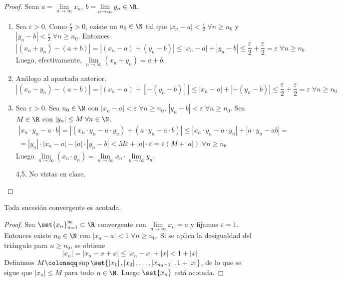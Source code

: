 \begin{proof}
	Sean \(a = \lim\limits_{n \to \infty} x_n \), \(b = \lim\limits_{n \to \infty} y_n \in \R\).
	\begin{enumerate}
		\item Sea \(\varepsilon > 0 \). Como \(\frac{\epsilon}{2} > 0\),   existe un \(n_0 \in \N 	\) tal que \(|x_n - a| < \frac{\varepsilon}{2} \; \forall n \geq n_0\) y  \(|y_n - b| < \frac{\varepsilon}{2} \; \forall n \geq n_0 \). Entonces
		      \[
			      |(x_n + y_n) - (a + b) | = |(x_n - a) + (y_n - b)| \leq |x_n - a| + |y_n - b| \leq \frac{\varepsilon}{2} + \frac{\varepsilon}{2} = \varepsilon \; \forall n \geq n_0
		      \]
		      Luego, efectivamente, \(\lim\limits_{n \to \infty} (x_n + y_n) = a + b \).
		\item Análogo al apartado anterior.
		      \[
			      |(x_n - y_n) - (a - b) | = |(x_n - a) +  [-(y_n - b)]| \leq |x_n - a| + |-(y_n - b)| \leq \frac{\varepsilon}{2} + \frac{\varepsilon}{2} = \varepsilon \; \forall n \geq n_0
		      \]
		\item Sea \(\varepsilon > 0 \). Sea \(n_0 \in \N \) con \(|x_n - a| < \varepsilon \; \forall n \geq n_0 \), \(|y_n - b| < \varepsilon \; \forall n \geq n_0 \). Sea \(M \in \R \) con \(|y_n| \leq M \; \forall n \in \N\).
		      \begin{multline*}
			      |x_n \cdot y_n - a \cdot b| = |(x_n \cdot y_n - a \cdot y_n) + (a \cdot y_n - a \cdot b)| \leq |x_n \cdot y_n - a \cdot y_n | + |a \cdot y_n - ab| = \\ = |y_n| \cdot |x_n - a| - |a| \cdot |y_n - b| < M \varepsilon + |a| \cdot \varepsilon = \varepsilon(M + |a|) \; \forall n \geq n_0
		      \end{multline*}
		      Luego \(\lim\limits_{n \to \infty} (x_n \cdot y_n) = \lim\limits_{n \to \infty} x_n \cdot \lim\limits_{n \to \infty} y_n \).
		\item[4,5.] No vistas en clase.
	\end{enumerate}
\end{proof}
\begin{proposition}
	Toda sucesión convergente es acotada.
\end{proposition}
\begin{proof}
	Sea \(\set{x_n}^{\infty}_{n = 1 } \subset \R\) convergente con \(\lim\limits_{n \to \infty} x_n = a \) y fijamos \(\varepsilon = 1 \). Entonces existe \(n_0 \in \N \) con \(|x_n - a| < 1 \; \forall n \geq n_0 \). Si se aplica la desigualdad del triángulo para \(n \geq n_0 \), se obtiene
	\[
		\left\vert x_n  \right\vert = \left\vert x_n - x + x  \right\vert \leq \left\vert x_n - x  \right\vert + \left\vert x  \right\vert < 1 + \left\vert x  \right\vert
	\]
	Definimos
	\(
	M \coloneqq \sup \set{\left\vert x_1  \right\vert, \left\vert x_2  \right\vert, \ldots, \left\vert x_{n_0 - 1} \right\vert, 1 + \left\vert x  \right\vert}
	\), de lo que se sigue que \(\left\vert x_n  \right\vert \leq M \) para todo \(n \in \N \). Luego \(\set{x_n}\) está acotada.  
\end{proof}
